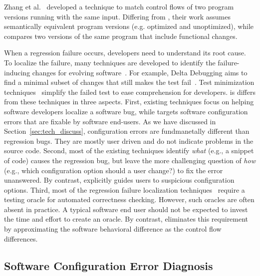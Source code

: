 Zhang et al.~\cite{Zhang:2005:MEH} developed a technique to match
control flows of two program versions running with
the same input. Differing from \ourtool, their
work assumes semantically equivalent program versions (e.g. optimized
and unoptimized), while \ourtool compares two versions
of the same program that include functional changes. 

When a regression failure occurs, developers need
to understand its root cause. To localize the
failure, many techniques are developed to identify the
failure-inducing changes for evolving
software~\cite{Banerjee:2010:GID, r2fix, Qi:2009:DAD, Hoffman:2009:STA}.
For example, Delta Debugging aims to find a minimal
subset of changes that still makes the test fail~\cite{dd}.
Test minimization techniques~\cite{Hoffman:2009:STA, Zhang:2013:PST}
simplify the failed
test to ease comprehension for developers. 
\ourtool is differs from these techniques in three aspects.
First, existing techniques focus on helping software developers
localize a software bug, while \ourtool targets software
configuration errors that are fixable by software end-users.
As we have discussed in Section~\ref{sec:tech_discuss},
configuration errors are fundmanetally different than regression bugs.
They are mostly user driven and do not indicate problems in the source
code. Second, most of the existing techniques identify
\textit{what} (e.g., a snippet of code) causes the
regression bug, but leave
the more challenging question of \textit{how} (e.g., which
configuration option should a user change?) to
fix the error unanswered. By contrast, \ourtool
explicitly guides users to suspicious configuration options.
Third, most of the regression failure localization
techniques~\cite{dd} require 
a testing oracle for automated correctness checking. However,
such oracles are often absent in practice. A typical
software end user should not be expected to invest
the time and effort to create an oracle.
By contrast, \ourtool eliminates this requirement by
approximating the software behavioral difference as the control
flow differences.


\subsection{Software Configuration Error Diagnosis}

